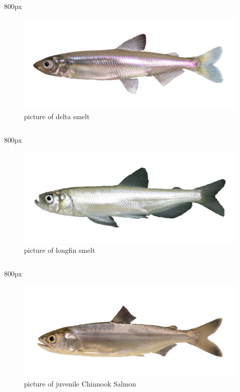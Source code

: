 \documentclass[
]{book}
\begin{document}
\begin{column}{800px\textwidth}
\begin{figure}

{\centering \includegraphics[width=29.17in]{figures/delta_smelt} 

}

\caption{picture of delta smelt}\label{fig:unnamed-chunk-179}
\end{figure}
\end{column}

\begin{column}{800px\textwidth}
\begin{figure}

{\centering \includegraphics[width=29.17in]{figures/longfin_smelt_adult} 

}

\caption{picture of longfin smelt}\label{fig:unnamed-chunk-180}
\end{figure}
\end{column}

\begin{column}{800px\textwidth}
\begin{figure}

{\centering \includegraphics[width=29.17in]{figures/chinook_salmon_smolt} 

}

\caption{picture of juvenile Chinnook Salmon}\label{fig:unnamed-chunk-181}
\end{figure}
\end{column}
\end{document}
